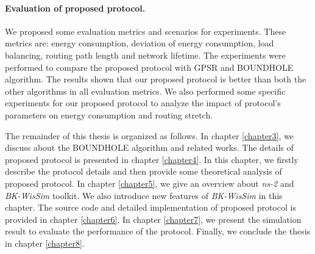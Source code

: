 \paragraph{Evaluation of proposed protocol.\\}
We proposed some evaluation metrics and scenarios for experiments. These metrics are: energy consumption, deviation of energy consumption, load balancing, routing path length and network lifetime. The experiments were performed to compare the proposed protocol with GPSR and BOUNDHOLE algorithm. The results shown that our proposed protocol is better than both the other algorithms in all evaluation metrics. We also performed some specific experiments for our proposed protocol to analyze the impact of protocol's parameters on energy consumption and routing stretch.

The remainder of this thesis is organized as follows. In chapter \ref{chapter3}, we discuss about the BOUNDHOLE algorithm and related works. The details of proposed protocol is presented in chapter \ref{chapter4}. In this chapter, we firstly describe the protocol details and then provide some theoretical analysis of proposed protocol. In chapter \ref{chapter5}, we give an overview about \emph{ns-2} and \emph{BK-WisSim} toolkit. We also introduce new features of \emph{BK-WisSim} in this chapter. The source code and detailed implementation of proposed protocol is provided in chapter \ref{chapter6}. In chapter \ref{chapter7}, we present the simulation result to evaluate the performance of the protocol. Finally, we conclude the thesis in chapter \ref{chapter8}. 